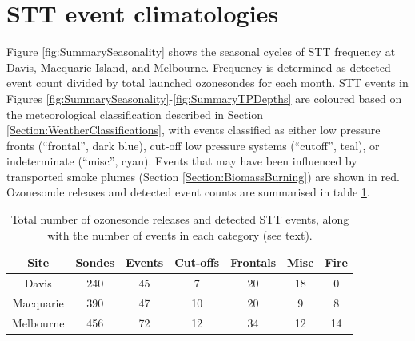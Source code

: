 \documentclass{article}
\begin{document}
\section{STT event climatologies}
  \label{sec:eventclimatologies}
  Figure \ref{fig:SummarySeasonality} shows the seasonal cycles of STT frequency at Davis, Macquarie Island, and Melbourne.
  Frequency is determined as detected event count divided by total launched ozonesondes for each month.
  STT events in Figures \ref{fig:SummarySeasonality}-\ref{fig:SummaryTPDepths} are coloured based on the meteorological classification described in Section \ref{Section:WeatherClassifications}, with events classified as either low pressure fronts (“frontal”, dark blue), cut-off low pressure systems (“cutoff”, teal), or indeterminate (“misc”, cyan).
  Events that may have been influenced by transported smoke plumes (Section \ref{Section:BiomassBurning}) are shown in red.
  Ozonesonde releases and detected event counts are summarised in table \ref{table:EventCounts}.
  \begin{table}[htbp!]
    \centering
    \begin{tabular}{| c | c | c | c | c | c | c |} 
      \hline
      Site & Sondes & Events & Cut-offs & Frontals & Misc & Fire \\
      \hline
      Davis     & 240 & 45 & 7  & 20 & 18 & 0 \\ 
      Macquarie & 390 & 47 & 10 & 20 & 9 & 8 \\
      Melbourne & 456 & 72 & 12 & 34 & 12 & 14 \\
      \hline
    \end{tabular}
    \caption{Total number of ozonesonde releases and detected STT events, along with the number of events in each category (see text).}
    \label{table:EventCounts}
  \end{table}
  
\end{document}
